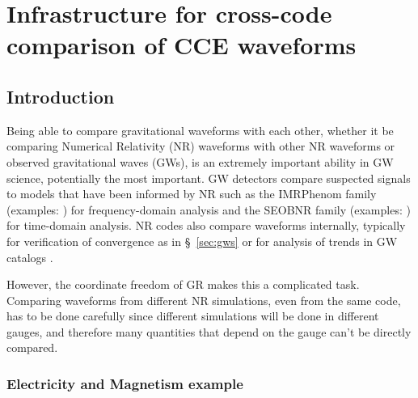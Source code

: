 \chapter{Infrastructure for cross-code comparison of CCE waveforms\label{ch:compare}}

\begin{bibunit}[unsrtnat]

\section{Introduction}

Being able to compare gravitational waveforms with each other, whether it be
comparing Numerical Relativity (NR) waveforms with other NR waveforms or
observed gravitational waves (GWs), is an extremely important ability in GW
science, potentially the most important. GW detectors compare suspected signals
to models that have been informed by NR such as the IMRPhenom family
(examples: \cite{Pratten:2020fqn, Garcia-Quiros:2020qpx, Pratten:2020ceb}) for
frequency-domain analysis and the SEOBNR family (examples:
\cite{Khalil:2023kep, Ramos-Buades:2023ehm, vandeMeent:2023ols}) for time-domain
analysis. NR codes also compare waveforms internally, typically for verification
of convergence as in \S~\ref{sec:gws} or for analysis of trends in GW catalogs
\cite{Scheel:2025jct}.

However, the coordinate freedom of GR makes this a complicated task. Comparing
waveforms from different NR simulations, even from the same code, has to be done
carefully since different simulations will be done in different gauges, and
therefore many quantities that depend on the gauge can't be directly compared.

\subsection{Electricity and Magnetism example}


\end{bibunit}
